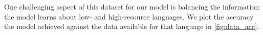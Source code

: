 \documentclass[11pt,a4paper]{article}
\newcommand\jp[1]{\textbf{JP: #1}}
\begin{document}







One challenging aspect of this dataset for our model is balancing the
information the model learns about low- and high-resource
languages. We plot the accuracy the model achieved against the data
available for that language in \cref{fig:data_acc}.
\end{document}
